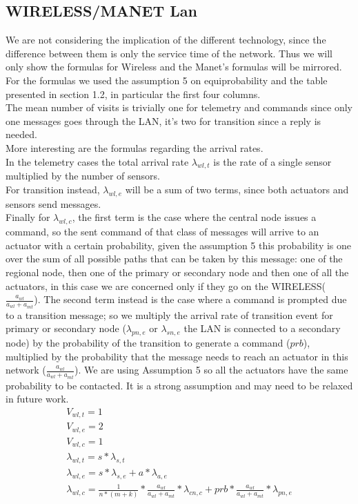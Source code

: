 \documentclass[11pt]{article}
\begin{document}
\subsection{WIRELESS/MANET Lan}
We are not considering the implication of the different technology, since the difference between them is only the service time of the network. Thus we will only show the formulas for Wireless and the Manet's formulas will be mirrored.\\
For the formulas we used the assumption 5 on equiprobability and the table presented in section 1.2, in particular the first four columns.\\
The mean number of visits is trivially one for telemetry and commands since only one messages goes through the LAN, it's two for transition since a reply is needed.\\
More interesting are the formulas regarding the arrival rates.\\
In the telemetry cases the total arrival rate $\lambda_{wl, t}$ is the rate of a single sensor multiplied by the number of sensors.\\
For transition instead, $\lambda_{wl, e}$ will be a sum of two terms, since both actuators and sensors send messages.\\
Finally for $\lambda_{wl, c}$, the first term is the case where the central node issues a command, so the sent command of that class of messages will arrive to an actuator with a certain probability, given the assumption 5 this probability is one over the sum of all possible paths that can be taken by this message: one of the regional node, then one of the primary or secondary node and then one of all the actuators, in this case we are concerned only if they go on the WIRELESS($\frac{a_{wl}}{a_{wl}+a_{mt}}$). The second term instead is the case where a command is prompted due to a transition message; so we multiply the arrival rate of transition event for primary or secondary node ($\lambda_{pn,e}$ or $\lambda_{sn,e}$ the LAN is connected to a secondary node) by the probability of the transition to generate a command ($prb$), multiplied by the probability that the message needs to reach an actuator in this network ($\frac{a_{wl}}{a_{wl}+a_{mt}}$). We are using Assumption 5 so all the actuators have the same probability to be contacted. It is a strong assumption and may need to be relaxed in future work.\\
\begin{equation}
    \begin{array}{l}
        V_{wl, t} = 1 \\
        V_{wl, e} = 2 \\ %
        V_{wl,c} = 1 \\
        \lambda_{wl, t} = s*\lambda_{s, t} \\
        \lambda_{wl, e} = s*\lambda_{s, e} + a*\lambda_{a, e} \\
				\lambda_{wl, c} = \frac{1}{n*(m+k)} * \frac{a_{wl}}{a_{wl}+a_{mt}} * \lambda_{cn, c} + prb * \frac{a_{wl}}{a_{wl}+a_{mt}} * \lambda_{pn,e}   \\\
    \end{array}
\end{equation}
\end{document}
